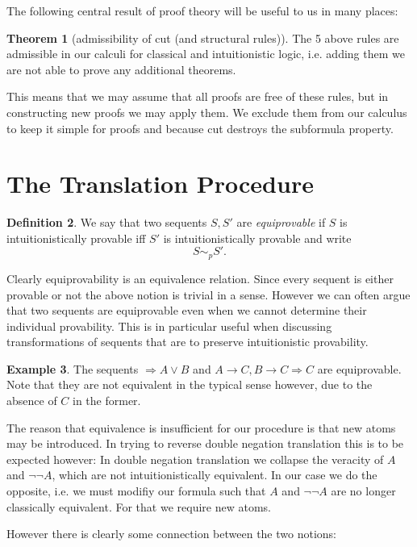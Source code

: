 \documentclass[a4paper,12pt]{article}
\theoremstyle{definition}
\newtheorem{theorem}{Theorem}[section]
\theoremstyle{definition}
\theoremstyle{definition}
\theoremstyle{definition}
\theoremstyle{definition}
\newtheorem{definition}[theorem]{Definition}
\theoremstyle{definition}
\newtheorem{example}[theorem]{Example}
\begin{document}
	The following central result of proof theory will be useful to us in many places:
	\begin{theorem}[admissibility of cut (and structural rules)]
		The 5 above rules are admissible in our calculi for classical and intuitionistic logic, i.e. adding them we are not able to prove any additional theorems.
	\end{theorem}


	This means that we may assume that all proofs are free of these rules, but in constructing new proofs we may apply them. We exclude them from our calculus to keep it simple for proofs and because cut destroys the subformula property.

	\section{The Translation Procedure}
	
	\begin{definition}
		We say that two sequents $S, S'$ are \textit{equiprovable} if $S$ is intuitionistically provable iff $S'$ is intuitionistically provable and write $$S\sim_p S'.$$
	\end{definition}

	Clearly equiprovability is an equivalence relation. Since every sequent is either provable or not the above notion is trivial in a sense. However we can often argue that two sequents are equiprovable even when we cannot determine their individual provability. This is in particular useful when discussing transformations of sequents that are to preserve intuitionistic provability.
	
	\begin{example}
		The sequents $\Rightarrow A\vee B$ and $A\to C, B\to C\Rightarrow C$ are equiprovable. Note that they are not equivalent in the typical sense however, due to the absence of $C$ in the former. 
	\end{example}

		The reason that equivalence is insufficient for our procedure is that new atoms may be introduced. In trying to reverse double negation translation this is to be expected however: In double negation translation we collapse the veracity of $A$ and $\neg\neg A$, which are not intuitionistically equivalent. In our case we do the opposite, i.e. we must modifiy our formula such that $A$ and $\neg\neg A$ are no longer classically equivalent. For that we require new atoms.

		However there is clearly some connection between the two notions:
		
\end{document}
